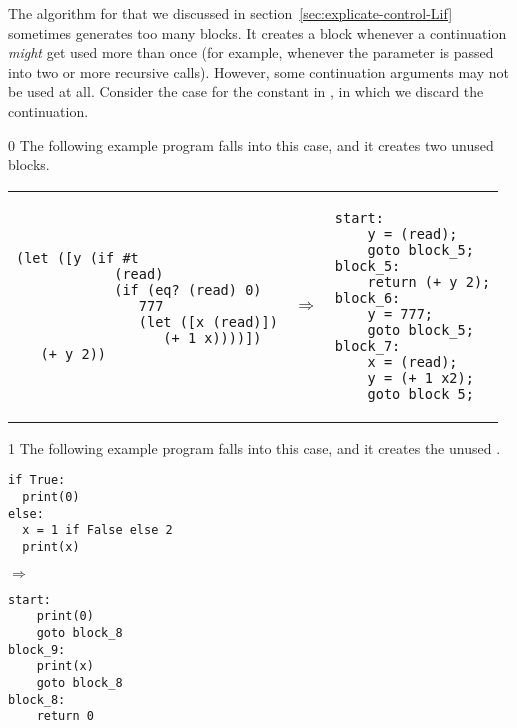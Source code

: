 \documentclass[7x10]{TimesAPriori_MIT}%
\def\racketEd{0}
\def\pythonEd{1}
\def\edition{1}
\numberwithin{theorem}{chapter}
\numberwithin{definition}{chapter}
\numberwithin{equation}{chapter}
\begin{document}
The algorithm for  that we discussed in
section~\ref{sec:explicate-control-Lif} sometimes generates too many
blocks. It creates a block whenever a continuation \emph{might} get
used more than once (for example, whenever the  parameter
is passed into two or more recursive calls). However, some
continuation arguments may not be used at all. Consider the case for
the constant \TRUE{} in , in which we discard
the  continuation.
%
{\if\edition\racketEd
The following example program falls into this
case, and it creates two unused blocks.       
\begin{center}
\begin{tabular}{lll}
\begin{minipage}{0.4\textwidth}
\begin{lstlisting}
(let ([y (if #t
            (read)
            (if (eq? (read) 0)
               777
               (let ([x (read)])
                  (+ 1 x))))])
   (+ y 2))
\end{lstlisting}
\end{minipage}
&
$\Rightarrow$
&
\begin{minipage}{0.4\textwidth}
\begin{lstlisting}
start:
    y = (read);
    goto block_5;
block_5:
    return (+ y 2);
block_6:
    y = 777;
    goto block_5;
block_7:
    x = (read);
    y = (+ 1 x2);
    goto block_5;
\end{lstlisting}
\end{minipage}
\end{tabular} 
\end{center}
\fi}
{\if\edition\pythonEd
The following example program falls into this
case, and it creates the unused .       
\begin{center}
\begin{minipage}{0.4\textwidth}
\begin{lstlisting}
if True:
  print(0)
else:
  x = 1 if False else 2
  print(x)
\end{lstlisting}
\end{minipage}
$\Rightarrow\qquad\qquad$
\begin{minipage}{0.4\textwidth}
\begin{lstlisting}
start:
    print(0)
    goto block_8
block_9:
    print(x)
    goto block_8
block_8:
    return 0
\end{lstlisting}
\end{minipage}
\end{center}
\fi}
\end{document}
